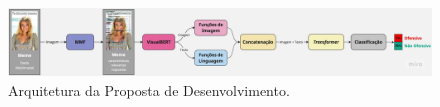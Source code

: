 \begin{figure}[!htbp]
	\centering
	\includegraphics[scale=0.18]{imagens/diagrama.jpeg}
    \caption {Arquitetura da Proposta de Desenvolvimento.}
\end{figure}





